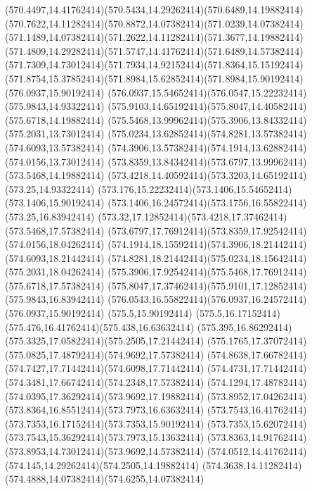 {{	\curveto(570.4497,14.41762414)(570.5434,14.29262414)(570.6489,14.19882414)
	\curveto(570.7622,14.11282414)(570.8872,14.07382414)(571.0239,14.07382414)
	\curveto(571.1489,14.07382414)(571.2622,14.11282414)(571.3677,14.19882414)
	\curveto(571.4809,14.29282414)(571.5747,14.41762414)(571.6489,14.57382414)
	\curveto(571.7309,14.73012414)(571.7934,14.92152414)(571.8364,15.15192414)
	\curveto(571.8754,15.37852414)(571.8984,15.62852414)(571.8984,15.90192414)
	\closepath
	\moveto(576.0937,15.90192414)
	\curveto(576.0937,15.54652414)(576.0547,15.22232414)(575.9843,14.93322414)
	\curveto(575.9103,14.65192414)(575.8047,14.40582414)(575.6718,14.19882414)
	\curveto(575.5468,13.99962414)(575.3906,13.84332414)(575.2031,13.73012414)
	\curveto(575.0234,13.62852414)(574.8281,13.57382414)(574.6093,13.57382414)
	\curveto(574.3906,13.57382414)(574.1914,13.62882414)(574.0156,13.73012414)
	\curveto(573.8359,13.84342414)(573.6797,13.99962414)(573.5468,14.19882414)
	\curveto(573.4218,14.40592414)(573.3203,14.65192414)(573.25,14.93322414)
	\curveto(573.176,15.22232414)(573.1406,15.54652414)(573.1406,15.90192414)
	\curveto(573.1406,16.24572414)(573.1756,16.55822414)(573.25,16.83942414)
	\curveto(573.32,17.12852414)(573.4218,17.37462414)(573.5468,17.57382414)
	\curveto(573.6797,17.76912414)(573.8359,17.92542414)(574.0156,18.04262414)
	\curveto(574.1914,18.15592414)(574.3906,18.21442414)(574.6093,18.21442414)
	\curveto(574.8281,18.21442414)(575.0234,18.15642414)(575.2031,18.04262414)
	\curveto(575.3906,17.92542414)(575.5468,17.76912414)(575.6718,17.57382414)
	\curveto(575.8047,17.37462414)(575.9101,17.12852414)(575.9843,16.83942414)
	\curveto(576.0543,16.55822414)(576.0937,16.24572414)(576.0937,15.90192414)
	\closepath
	\moveto(575.5,15.90192414)
	\curveto(575.5,16.17152414)(575.476,16.41762414)(575.438,16.63632414)
	\curveto(575.395,16.86292414)(575.3325,17.05822414)(575.2505,17.21442414)
	\curveto(575.1765,17.37072414)(575.0825,17.48792414)(574.9692,17.57382414)
	\curveto(574.8638,17.66782414)(574.7427,17.71442414)(574.6098,17.71442414)
	\curveto(574.4731,17.71442414)(574.3481,17.66742414)(574.2348,17.57382414)
	\curveto(574.1294,17.48782414)(574.0395,17.36292414)(573.9692,17.19882414)
	\curveto(573.8952,17.04262414)(573.8364,16.85512414)(573.7973,16.63632414)
	\curveto(573.7543,16.41762414)(573.7353,16.17152414)(573.7353,15.90192414)
	\curveto(573.7353,15.62072414)(573.7543,15.36292414)(573.7973,15.13632414)
	\curveto(573.8363,14.91762414)(573.8953,14.73012414)(573.9692,14.57382414)
	\curveto(574.0512,14.41762414)(574.145,14.29262414)(574.2505,14.19882414)
	\curveto(574.3638,14.11282414)(574.4888,14.07382414)(574.6255,14.07382414)
}}
